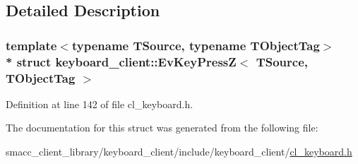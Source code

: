 \subsection{Detailed Description}
\subsubsection*{template$<$typename T\+Source, typename T\+Object\+Tag$>$\\*
struct keyboard\+\_\+client\+::\+Ev\+Key\+Press\+Z$<$ T\+Source, T\+Object\+Tag $>$}



Definition at line 142 of file cl\+\_\+keyboard.\+h.



The documentation for this struct was generated from the following file\+:\begin{DoxyCompactItemize}
\item 
smacc\+\_\+client\+\_\+library/keyboard\+\_\+client/include/keyboard\+\_\+client/\hyperlink{cl__keyboard_8h}{cl\+\_\+keyboard.\+h}\end{DoxyCompactItemize}
